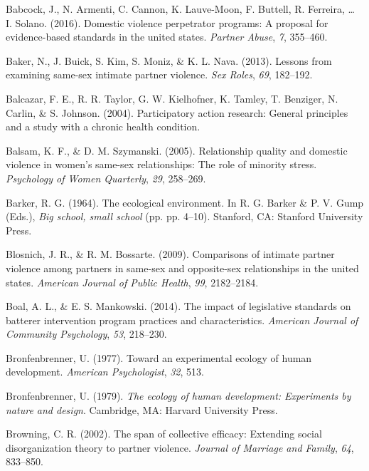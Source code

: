 \documentclass[11pt,]{tufte-book}
\begin{document}
\hypertarget{ref-babcock2016domestic}{}
Babcock, J., N. Armenti, C. Cannon, K. Lauve-Moon, F. Buttell, R.
Ferreira, \ldots{} I. Solano. (2016). Domestic violence perpetrator
programs: A proposal for evidence-based standards in the united states.
\emph{Partner Abuse}, \emph{7}, 355--460.

\hypertarget{ref-baker2013lessons}{}
Baker, N., J. Buick, S. Kim, S. Moniz, \& K. L. Nava. (2013). Lessons
from examining same-sex intimate partner violence. \emph{Sex Roles},
\emph{69}, 182--192.

\hypertarget{ref-balcazar2004participatory}{}
Balcazar, F. E., R. R. Taylor, G. W. Kielhofner, K. Tamley, T. Benziger,
N. Carlin, \& S. Johnson. (2004). Participatory action research: General
principles and a study with a chronic health condition.

\hypertarget{ref-balsam2005relationship}{}
Balsam, K. F., \& D. M. Szymanski. (2005). Relationship quality and
domestic violence in women's same-sex relationships: The role of
minority stress. \emph{Psychology of Women Quarterly}, \emph{29},
258--269.

\hypertarget{ref-barker1964ecological}{}
Barker, R. G. (1964). The ecological environment. In R. G. Barker \& P.
V. Gump (Eds.), \emph{Big school, small school} (pp. pp. 4--10).
Stanford, CA: Stanford University Press.

\hypertarget{ref-blosnich2009comparisons}{}
Blosnich, J. R., \& R. M. Bossarte. (2009). Comparisons of intimate
partner violence among partners in same-sex and opposite-sex
relationships in the united states. \emph{American Journal of Public
Health}, \emph{99}, 2182--2184.

\hypertarget{ref-boal2014impact}{}
Boal, A. L., \& E. S. Mankowski. (2014). The impact of legislative
standards on batterer intervention program practices and
characteristics. \emph{American Journal of Community Psychology},
\emph{53}, 218--230.

\hypertarget{ref-bronfenbrenner1977toward}{}
Bronfenbrenner, U. (1977). Toward an experimental ecology of human
development. \emph{American Psychologist}, \emph{32}, 513.

\hypertarget{ref-bronfenbrenner1979ecology}{}
Bronfenbrenner, U. (1979). \emph{The ecology of human development:
Experiments by nature and design}. Cambridge, MA: Harvard University
Press.

\hypertarget{ref-browning2002span}{}
Browning, C. R. (2002). The span of collective efficacy: Extending
social disorganization theory to partner violence. \emph{Journal of
Marriage and Family}, \emph{64}, 833--850.
\end{document}
